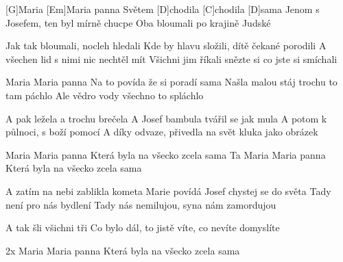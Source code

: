 
[G]Maria [Em]Maria panna
Světem [D]chodila [C]chodila [D]sama
Jenom s Josefem, ten byl mírně chucpe
Oba bloumali po krajině Judské

Jak tak bloumali, nocleh hledali
Kde by hlavu složili, dítě čekané porodili
A všechen lid s nimi nic nechtěl mít
Všichni jim říkali snězte si co jste si smíchali

Maria Maria panna
Na to povída že si poradí sama
Našla malou stáj trochu to tam páchlo
Ale vědro vody všechno to spláchlo

A pak ležela a trochu brečela
A Josef bambula tvářil se jak mula
A potom k půlnoci, s boží pomocí
A díky odvaze, přivedla na svět kluka jako obrázek

Maria Maria panna
Která byla na všecko zcela sama
Ta Maria Maria panna
Která byla na všecko zcela sama

A zatím na nebi zablikla kometa
Marie povídá Josef chystej se do světa
Tady není pro nás bydlení
Tady nás nemilujou, syna nám zamordujou

A tak šli všichni tři
Co bylo dál, to jistě víte, co nevíte domyslíte

2x Maria Maria panna
Která byla na všecko zcela sama
\slpc